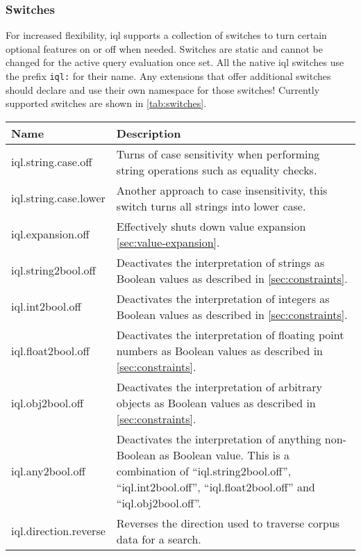 \documentclass[11pt,a4paper]{article}
\begin{document}
\subsubsection{Switches}
\label{sec:json-ld-switches}
For increased flexibility, \ac{iql} supports a collection of switches to turn certain optional features on or off when needed. Switches are static and cannot be changed for the active query evaluation once set. All the native \ac{iql} switches use the prefix \texttt{iql:} for their name. Any extensions that offer additional switches should declare and use their own namespace for those switches! Currently supported switches are shown in \cref{tab:switches}.

\begin{table}[!htb]
\noindent\begin{tabular}{|p{}|p{}|}
\hline 
\textbf{Name}	& \textbf{Description} \\ 
\hline 
\hline
iql.string.case.off         & Turns of case sensitivity when performing string operations such as equality checks.  \\ 
\hline
iql.string.case.lower       & Another approach to case insensitivity, this switch turns all strings into lower case.  \\ 
\hline
iql.expansion.off           & Effectively shuts down value expansion \cref{sec:value-expansion}.  \\ 
\hline
iql.string2bool.off         & Deactivates the interpretation of strings as Boolean values as described in \cref{sec:constraints}.  \\ 
\hline
iql.int2bool.off            & Deactivates the interpretation of integers as Boolean values as described in \cref{sec:constraints}.  \\ 
\hline
iql.float2bool.off          & Deactivates the interpretation of floating point numbers as Boolean values as described in \cref{sec:constraints}.  \\ 
\hline
iql.obj2bool.off            & Deactivates the interpretation of arbitrary objects as Boolean values as described in \cref{sec:constraints}.  \\ 
\hline
iql.any2bool.off            & Deactivates the interpretation of anything non-Boolean as Boolean value. This is a combination of ``iql.string2bool.off'', ``iql.int2bool.off'', ``iql.float2bool.off'' and  ``iql.obj2bool.off''.  \\ 
\hline
iql.direction.reverse       & Reverses the direction used to traverse corpus data for a search.  \\ 

\end{tabular}
\end{table}
\end{document}

